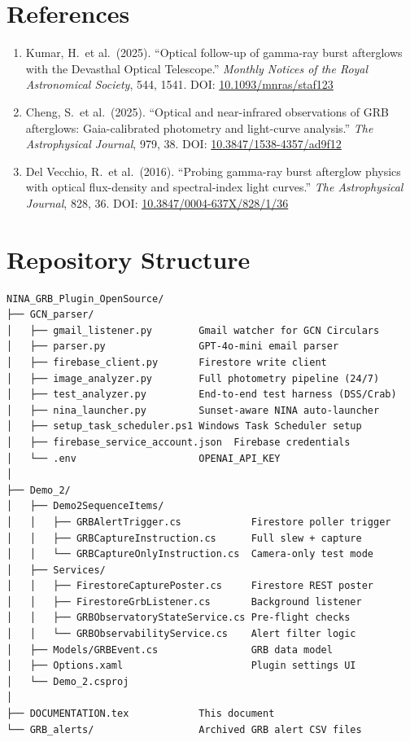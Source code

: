 \documentclass[12pt,a4paper]{article}
\begin{document}
\section{References}

\begin{enumerate}
    \item Kumar, H.\ et al.\ (2025). ``Optical follow-up of gamma-ray burst
          afterglows with the Devasthal Optical Telescope.''
          \textit{Monthly Notices of the Royal Astronomical Society},
          544, 1541.
          DOI: \href{https://doi.org/10.1093/mnras/staf123}{10.1093/mnras/staf123}

    \item Cheng, S.\ et al.\ (2025). ``Optical and near-infrared observations
          of GRB afterglows: Gaia-calibrated photometry and light-curve
          analysis.'' \textit{The Astrophysical Journal}, 979, 38.
          DOI: \href{https://doi.org/10.3847/1538-4357/ad9f12}{10.3847/1538-4357/ad9f12}

    \item Del Vecchio, R.\ et al.\ (2016). ``Probing gamma-ray burst
          afterglow physics with optical flux-density and spectral-index
          light curves.'' \textit{The Astrophysical Journal}, 828, 36.
          DOI: \href{https://doi.org/10.3847/0004-637X/828/1/36}{10.3847/0004-637X/828/1/36}
\end{enumerate}

\appendix
\section{Repository Structure}

\begin{verbatim}
NINA_GRB_Plugin_OpenSource/
├── GCN_parser/
│   ├── gmail_listener.py        Gmail watcher for GCN Circulars
│   ├── parser.py                GPT-4o-mini email parser
│   ├── firebase_client.py       Firestore write client
│   ├── image_analyzer.py        Full photometry pipeline (24/7)
│   ├── test_analyzer.py         End-to-end test harness (DSS/Crab)
│   ├── nina_launcher.py         Sunset-aware NINA auto-launcher
│   ├── setup_task_scheduler.ps1 Windows Task Scheduler setup
│   ├── firebase_service_account.json  Firebase credentials
│   └── .env                     OPENAI_API_KEY
│
├── Demo_2/
│   ├── Demo2SequenceItems/
│   │   ├── GRBAlertTrigger.cs            Firestore poller trigger
│   │   ├── GRBCaptureInstruction.cs      Full slew + capture
│   │   └── GRBCaptureOnlyInstruction.cs  Camera-only test mode
│   ├── Services/
│   │   ├── FirestoreCapturePoster.cs     Firestore REST poster
│   │   ├── FirestoreGrbListener.cs       Background listener
│   │   ├── GRBObservatoryStateService.cs Pre-flight checks
│   │   └── GRBObservabilityService.cs    Alert filter logic
│   ├── Models/GRBEvent.cs                GRB data model
│   ├── Options.xaml                      Plugin settings UI
│   └── Demo_2.csproj
│
├── DOCUMENTATION.tex            This document
└── GRB_alerts/                  Archived GRB alert CSV files
\end{verbatim}
\end{document}

